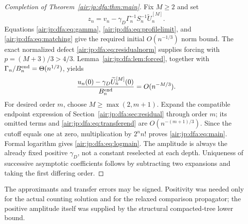 \documentclass[11pt,letterpaper]{article}
\numberwithin{equation}{section}
\theoremstyle{remark}
\begin{document}
\begin{proof}[Completion of Theorem~\ref{air:jp:dfa:thm:main}]
Fix $M\ge2$ and set
\[
 z_n=v_n-\gamma_D\Gamma_n^{-1}S_n^{-1}\widetilde U_n^{[M]}.
\]
Equations \eqref{air:jp:dfa:eq:gamma}, \eqref{air:jp:dfa:eq:profilelimit}, and \eqref{air:jp:dfa:eq:matching} give the required initial $O(n^{-1/3})$ norm bound. The exact normalized defect \eqref{air:jp:dfa:eq:residualnorm} supplies forcing with $p=(M+3)/3>4/3$. Lemma~\ref{air:jp:dfa:lem:forced}, together with $\Gamma_n/B_n^{\rm end}=\Theta(n^{1/2})$, yields
\begin{equation}\label{air:jp:dfa:eq:transferend}
 \frac{u_n(0)-\gamma_D\widetilde U_n^{[M]}(0)}{B_n^{\rm end}}
 =O(n^{-M/3}).
\end{equation}
For desired order $m$, choose $M\ge\max(2,m+1)$. Expand the compatible endpoint expression of Section~\ref{air:jp:dfa:sec:residual} through order $m$; its omitted terms and \eqref{air:jp:dfa:eq:transferend} are $O(n^{-(m+1)/3})$. Since the cutoff equals one at zero, multiplication by $2^n n!$ proves \eqref{air:jp:dfa:eq:main}. Formal logarithm gives \eqref{air:jp:dfa:eq:logmain}. The amplitude is always the already fixed positive $\gamma_D$, not a constant reselected at each depth. Uniqueness of successive asymptotic coefficients follows by subtracting two expansions and taking the first differing order.
\end{proof}

The approximants and transfer errors may be signed. Positivity was needed only for the actual counting solution and for the relaxed comparison propagator; the positive amplitude itself was supplied by the structural compacted-tree lower bound.
\end{document}
